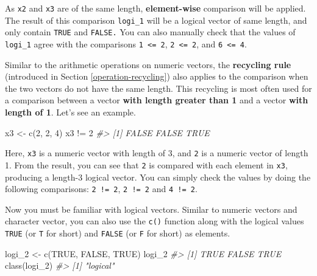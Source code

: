 \documentclass[
]{book}
\newenvironment{Shaded}{\begin{snugshade}}{\end{snugshade}}
\newcommand{\CommentTok}[1]{\textcolor[rgb]{0.56,0.35,0.01}{\textit{#1}}}
\newcommand{\ConstantTok}[1]{\textcolor[rgb]{0.00,0.00,0.00}{#1}}
\newcommand{\DecValTok}[1]{\textcolor[rgb]{0.00,0.00,0.81}{#1}}
\newcommand{\FunctionTok}[1]{\textcolor[rgb]{0.00,0.00,0.00}{#1}}
\newcommand{\NormalTok}[1]{#1}
\newcommand{\OtherTok}[1]{\textcolor[rgb]{0.56,0.35,0.01}{#1}}
\newcommand{\SpecialCharTok}[1]{\textcolor[rgb]{0.00,0.00,0.00}{#1}}
\begin{document}
As \texttt{x2} and \texttt{x3} are of the same length, \textbf{element-wise} comparison will be applied. The result of this comparison \texttt{logi\_1} will be a logical vector of same length, and only contain \texttt{TRUE} and \texttt{FALSE.} You can also manually check that the values of \texttt{logi\_1} agree with the comparisons \texttt{1\ \textless{}=\ 2}, \texttt{2\ \textless{}=\ 2}, and \texttt{6\ \textless{}=\ 4}.

Similar to the arithmetic operations on numeric vectors, the \textbf{recycling rule} (introduced in Section \ref{operation-recycling}) also applies to the comparison when the two vectors do not have the same length. This recycling is most often used for a comparison between a vector \textbf{with length greater than 1} and a vector \textbf{with length of 1}. Let's see an example.

\begin{Shaded}
\begin{Highlighting}[]
\NormalTok{x3 }\OtherTok{\textless{}{-}} \FunctionTok{c}\NormalTok{(}\DecValTok{2}\NormalTok{, }\DecValTok{2}\NormalTok{, }\DecValTok{4}\NormalTok{)}
\NormalTok{x3 }\SpecialCharTok{!=} \DecValTok{2} 
\CommentTok{\#\textgreater{} [1] FALSE FALSE  TRUE}
\end{Highlighting}
\end{Shaded}

Here, \texttt{x3} is a numeric vector with length of 3, and \texttt{2} is a numeric vector of length 1. From the result, you can see that \texttt{2} is compared with each element in \texttt{x3}, producing a length-3 logical vector. You can simply check the values by doing the following comparisons: \texttt{2\ !=\ 2}, \texttt{2\ !=\ 2} and \texttt{4\ !=\ 2}.

Now you must be familiar with logical vectors. Similar to numeric vectors and character vector, you can also use the \texttt{c()} function along with the logical values \texttt{TRUE} (or \texttt{T} for short) and \texttt{FALSE} (or \texttt{F} for short) as elements.

\begin{Shaded}
\begin{Highlighting}[]
\NormalTok{logi\_2 }\OtherTok{\textless{}{-}} \FunctionTok{c}\NormalTok{(}\ConstantTok{TRUE}\NormalTok{, }\ConstantTok{FALSE}\NormalTok{, }\ConstantTok{TRUE}\NormalTok{)}
\NormalTok{logi\_2}
\CommentTok{\#\textgreater{} [1]  TRUE FALSE  TRUE}
\FunctionTok{class}\NormalTok{(logi\_2)}
\CommentTok{\#\textgreater{} [1] "logical"}
\end{Highlighting}
\end{Shaded}
\end{document}
